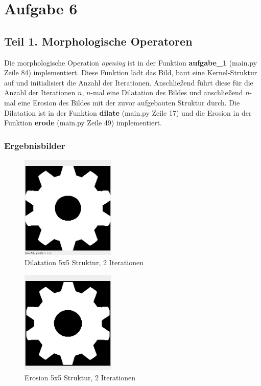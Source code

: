 \documentclass[12pt]{article}
\begin{document}

\section*{Aufgabe 6}
\subsection*{Teil 1. Morphologische Operatoren}
Die morphologische Operation \textit{opening} ist in der Funktion \textbf{aufgabe\_1} (main.py Zeile 84) implementiert.
Diese Funktion lädt das Bild, baut eine Kernel-Struktur auf und initialisiert die Anzahl der Iterationen. Anschließend führt diese für die Anzahl der Iterationen $n$, $n$-mal eine Dilatation des Bildes und anschließend $n$-mal eine Erosion des Bildes mit der zuvor aufgebauten Struktur durch.
Die Dilatation ist in der Funktion \textbf{dilate} (main.py Zeile 17) und die Erosion in der Funktion \textbf{erode} (main.py Zeile 49) implementiert.

\subsubsection*{Ergebnisbilder}
\begin{figure}[H]
  \centering
  \includegraphics[width=0.4\textwidth, keepaspectratio]{dilated.png}\\
  Dilatation 5x5 Struktur, 2 Iterationen
\end{figure}
\begin{figure}[H]
  \centering
  \includegraphics[width=0.4\textwidth, keepaspectratio]{eroded.png}\\
  Erosion 5x5 Struktur, 2 Iterationen
\end{figure}
\end{document}
